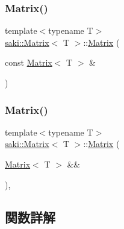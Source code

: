 \subsubsection{\texorpdfstring{Matrix()}{Matrix()}\hspace{0.1cm}{\footnotesize\ttfamily [5/6]}}
{\footnotesize\ttfamily template$<$typename T$>$ \\
\mbox{\hyperlink{classsaki_1_1_matrix}{saki\+::\+Matrix}}$<$ T $>$\+::\mbox{\hyperlink{classsaki_1_1_matrix}{Matrix}} (\begin{DoxyParamCaption}\item[{const \mbox{\hyperlink{classsaki_1_1_matrix}{Matrix}}$<$ T $>$ \&}]{ }\end{DoxyParamCaption})\hspace{0.3cm}{\ttfamily [default]}}

\mbox{\label{classsaki_1_1_matrix_aced6f31e05917c2c41305dd0be082f8b}} 
\subsubsection{\texorpdfstring{Matrix()}{Matrix()}\hspace{0.1cm}{\footnotesize\ttfamily [6/6]}}
{\footnotesize\ttfamily template$<$typename T$>$ \\
\mbox{\hyperlink{classsaki_1_1_matrix}{saki\+::\+Matrix}}$<$ T $>$\+::\mbox{\hyperlink{classsaki_1_1_matrix}{Matrix}} (\begin{DoxyParamCaption}\item[{\mbox{\hyperlink{classsaki_1_1_matrix}{Matrix}}$<$ T $>$ \&\&}]{ }\end{DoxyParamCaption})\hspace{0.3cm}{\ttfamily [default]}, {\ttfamily [noexcept]}}



\subsection{関数詳解}
\mbox{\label{classsaki_1_1_matrix_ac9e6609628221255fd9577eceb9ab2af}} 
